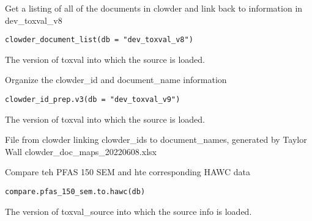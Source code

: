 \documentclass[letterpaper]{book}
\begin{document}
%
\begin{Description}\relax
Get a listing of all of the documents in clowder and link back to information in
dev\_toxval\_v8
\end{Description}
%
\begin{Usage}
\begin{verbatim}
clowder_document_list(db = "dev_toxval_v8")
\end{verbatim}
\end{Usage}
%
\begin{Arguments}
\begin{ldescription}
\item[\code{db}] The version of toxval into which the source is loaded.
\end{ldescription}
\end{Arguments}
%
\begin{Description}\relax
Organize the clowder\_id and document\_name information
\end{Description}
%
\begin{Usage}
\begin{verbatim}
clowder_id_prep.v3(db = "dev_toxval_v9")
\end{verbatim}
\end{Usage}
%
\begin{Arguments}
\begin{ldescription}
\item[\code{db}] The version of toxval into which the source is loaded.

File from clowder linking clowder\_ids to document\_names, generated by Taylor Wall
clowder\_doc\_maps\_20220608.xlsx
\end{ldescription}
\end{Arguments}
%
\begin{Description}\relax
Compare teh PFAS 150 SEM and hte corresponding HAWC data
\end{Description}
%
\begin{Usage}
\begin{verbatim}
compare.pfas_150_sem.to.hawc(db)
\end{verbatim}
\end{Usage}
%
\begin{Arguments}
\begin{ldescription}
\item[\code{db}] The version of toxval\_source into which the source info is loaded.
\end{ldescription}
\end{Arguments}
\end{document}
